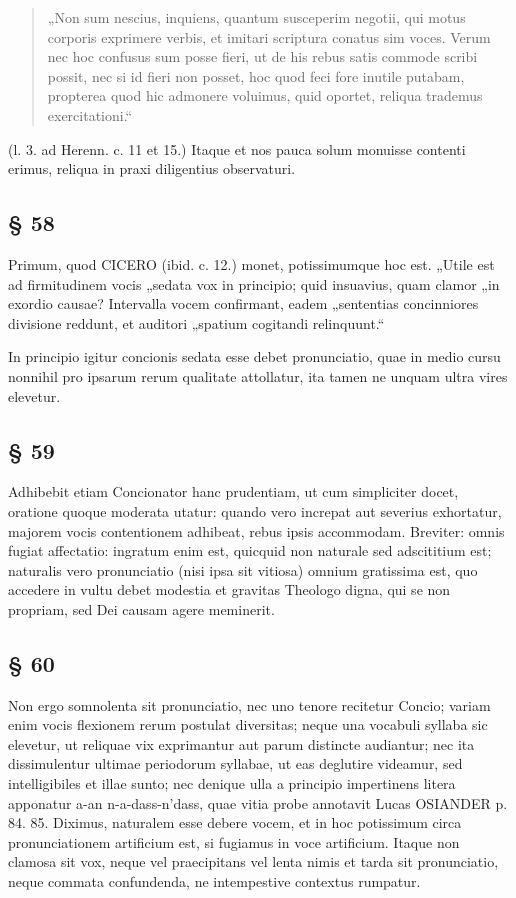\begin{quote}
„Non sum nescius, inquiens, quantum susceperim negotii, qui motus corporis exprimere verbis, et imitari scriptura conatus sim voces. Verum nec hoc confusus sum posse fieri, ut de his rebus satis commode scribi possit, nec si id fieri non posset, hoc quod feci fore inutile putabam, propterea quod hic admonere voluimus, quid oportet, reliqua trademus exercitationi.“
\end{quote}

(l. 3. ad Herenn. c. 11 et 15.) Itaque et nos pauca solum monuisse contenti erimus, reliqua in praxi diligentius observaturi.

\subsection{§ 58}

Primum, quod CICERO (ibid. c. 12.) monet, potissimumque hoc est. „Utile est ad firmitudinem vocis „sedata vox in principio; quid insuavius, quam clamor „in exordio causae? Intervalla vocem confirmant, eadem „sententias concinniores divisione reddunt, et auditori „spatium cogitandi relinquunt.“

In principio igitur concionis sedata esse debet pronunciatio, quae in medio cursu nonnihil pro ipsarum rerum qualitate attollatur, ita tamen ne unquam ultra vires elevetur.

\subsection{§ 59}

Adhibebit etiam Concionator hanc prudentiam, ut cum simpliciter docet, oratione quoque moderata utatur: quando vero increpat aut severius exhortatur, majorem vocis contentionem adhibeat, rebus ipsis accommodam. Breviter: omnis fugiat affectatio: ingratum enim est, quicquid non naturale sed adscititium est; naturalis vero pronunciatio (nisi ipsa sit vitiosa) omnium gratissima est, quo accedere in vultu debet modestia et gravitas Theologo digna, qui se non propriam, sed Dei causam agere meminerit.

\subsection{§ 60}

Non ergo somnolenta sit pronunciatio, nec uno tenore recitetur Concio; variam enim vocis flexionem rerum postulat diversitas; neque una vocabuli syllaba sic elevetur, ut reliquae vix exprimantur aut parum distincte audiantur; nec ita dissimulentur ultimae periodorum syllabae, ut eas deglutire videamur, sed intelligibiles et illae sunto; nec denique ulla a principio impertinens litera apponatur a-an n-a-dass-n’dass, quae vitia probe annotavit Lucas OSIANDER p. 84. 85. Diximus, naturalem esse debere vocem, et in hoc potissimum circa pronunciationem artificium est, si fugiamus in voce artificium. Itaque non clamosa sit vox, neque vel praecipitans vel lenta nimis et tarda sit pronunciatio, neque commata confundenda, ne intempestive contextus rumpatur.

